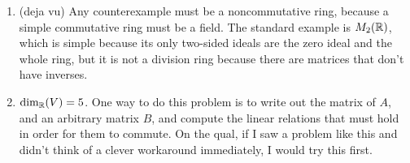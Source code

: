 \begin{solution}
\begin{enumerate}
    \item (deja vu) Any counterexample must be a noncommutative ring, because a simple commutative ring must be a field. The standard example is $M_2(\mathbb{R})$, which is simple because its only two-sided ideals are the zero ideal and the whole ring, but it is not a division ring because there are matrices that don't have inverses.
    \item $\dim_{\mathbb{R}}(V) = 5$. One way to do this problem is to write out the matrix of $A$, and an arbitrary matrix $B$, and compute the linear relations that must hold in order for them to commute. On the qual, if I saw a problem like this and didn't think of a clever workaround immediately, I would try this first.
    

\end{enumerate}
\end{solution}
